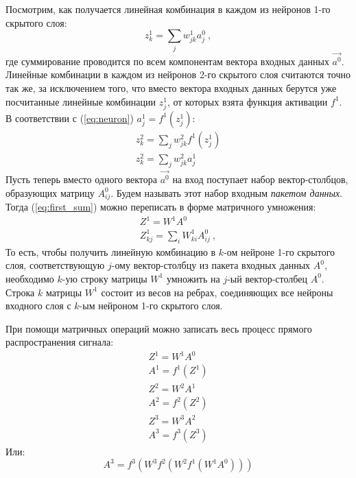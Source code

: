 \documentclass[a4paper,12pt]{article}
\theoremstyle{remark}
\begin{document}
	Посмотрим, как получается линейная комбинация в каждом из нейронов 1-го скрытого слоя:
	\begin{equation} \label{eq:first_sum}
		z_k^1 = \sum_j w_{jk}^1 a_j^0 \ ,
	\end{equation}
	где суммирование проводится по всем компонентам вектора входных данных $\vec{a^0}$. Линейные комбинации в каждом из нейронов 2-го скрытого слоя считаются точно так же, за исключением того, что вместо вектора входных данных берутся уже посчитанные линейные комбинации $z_j^1$, от которых взята функция активации $f^1$. В соответствии с (\ref{eq:neuron}) $a_j^1 = f^1(z_j^1)$:
	\begin{equation}
		\begin{gathered}
			z_k^2 = \sum_j w_{jk}^2 f^1(z_j^1) \\
			z_k^2 = \sum_j w_{jk}^2 a_j^1
		\end{gathered}
	\end{equation}
	Пусть теперь вместо одного вектора $\vec{a^0}$ на вход поступает набор вектор-столбцов, образующих матрицу $A_{ij}^0$. Будем называть этот набор входным \textit{пакетом данных}. Тогда (\ref{eq:first_sum}) можно переписать в форме матричного умножения:
	\begin{equation}
		\begin{gathered}
			Z^1 = W^1 A^0 \\
			Z_{kj}^1 = \sum_i W_{ki}^1 A_{ij}^0\ ,
		\end{gathered}
	\end{equation}
	То есть, чтобы получить линейную комбинацию в $k$-ом нейроне 1-го скрытого слоя, соответствующую $j$-ому вектор-столбцу из пакета входных данных $A^0$, необходимо $k$-ую строку матрицы $W^1$ умножить на $j$-ый вектор-столбец $A^0$. Строка $k$ матрицы $W^1$ состоит из весов на ребрах, соединяющих все нейроны входного слоя с $k$-ым нейроном 1-го скрытого слоя.
	
	При помощи матричных операций можно записать весь процесс прямого распространения сигнала:
	\begin{equation}
		\begin{gathered}
			Z^1 = W^1 A^0 \\
			A^1 = f^1(Z^1) \\
			Z^2 = W^2 A^1 \\
			A^2 = f^2(Z^2) \\
			Z^3 = W^3 A^2 \\
			A^3 = f^3(Z^3)
		\end{gathered}
	\end{equation}
	Или:
	\begin{equation}
		A^3 = f^3(W^3 f^2(W^2 f^1(W^1 A^0)))
	\end{equation}
	
\end{document}
